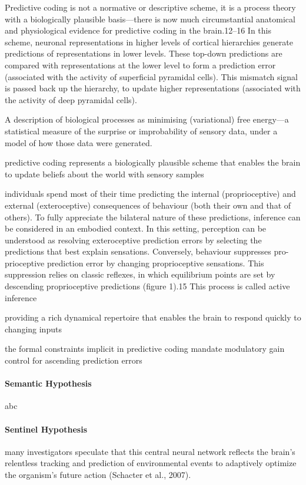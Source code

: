 \documentclass{article} %
\begin{document}
Predictive coding is not a normative or descriptive scheme, it is a process theory with a biologically plausible basis—there is now much circumstantial anatomical and physiological evidence for predictive coding in the brain.12–16 In this scheme, neuronal representations in higher levels of cortical hierarchies generate predictions of representations in lower levels. These top-down predictions are compared with representations at the lower level to form a prediction
error (associated with the activity of superficial pyramidal cells). This mismatch signal is passed back up the hierarchy, to update higher representations (associated with the activity of deep pyramidal cells).

A description of biological processes as minimising (variational) free energy—a statistical measure of the surprise or improbability of sensory data, under a model of how those data were generated.

predictive coding represents a biologically plausible scheme that enables the brain to update beliefs about the world with sensory samples

 individuals spend most of their time predicting the internal (proprioceptive) and external (exteroceptive) consequences of behaviour (both their own and that of others). To fully appreciate the bilateral nature of these predictions, inference can be considered in an embodied context. In this setting, perception can be understood as resolving exteroceptive prediction errors by selecting the predictions that best explain sensations. Conversely, behaviour suppresses pro- prioceptive prediction error by changing proprioceptive sensations. This suppression relies on classic reflexes, in which equilibrium points are set by descending proprioceptive predictions (figure 1).15 This process is called active inference

providing a rich dynamical repertoire that enables the brain to respond quickly to changing inputs

the formal constraints implicit in predictive coding mandate modulatory gain control for ascending prediction errors




\paragraph{Semantic Hypothesis}
abc

\paragraph{Sentinel Hypothesis}
many investigators speculate that this central neural network reflects the brain’s relentless tracking and prediction of environmental events to adaptively optimize the organism's future action (Schacter et al., 2007).
\end{document}

